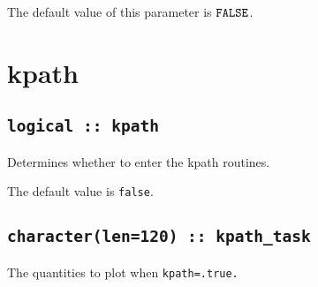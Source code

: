 The default value of this parameter is $\verb#FALSE#$.


\clearpage
\section{kpath}

\subsection[berry]{\tt logical :: kpath}
Determines whether to enter the kpath routines.

The default value is \verb#false#.


\subsection[kpath\_task]{\tt character(len=120) ::  kpath\_task} 
The quantities to plot when {\tt kpath=.true.} 

